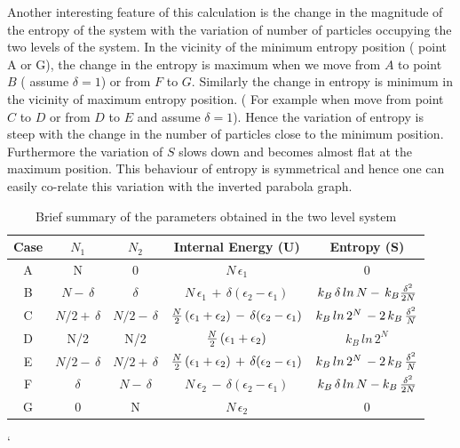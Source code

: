 \documentclass{article}
\begin{document}
Another interesting feature of this calculation  is the change in the magnitude of the entropy of the system with the variation of number of particles occupying the two levels of the system. In the vicinity of the minimum entropy position ( point A or G), the change in the entropy  is maximum when we move from $A$ to point $B$  ( assume $\delta = 1$) or from $ F$ to $ G$.
Similarly the change in entropy is minimum  in the vicinity of maximum entropy position. ( For example when move from point $C$ to $D$ or from $D$ to $E$ and assume $\delta = 1$). Hence the variation of entropy is steep  with the change in the number of particles close to the minimum  position. Furthermore the   variation of $S$  slows down and becomes almost flat at the maximum position. This behaviour of entropy is symmetrical and hence one can easily co-relate this variation with the inverted parabola graph.
 
\begin{table}[ht]
\centering
\renewcommand{\arraystretch}{3}
\begin{tabular}[b]{| c | c| c| c| c|}\hline
 Case & $N_1$ & $N_2 $& Internal Energy (U) & Entropy (S) \\ \hline \hline
A & N & 0 &$ N\,\epsilon_1 $& 0\\ \hline
B & $N - \, \delta$& $\delta$ & $ {N} \, \epsilon_1  \, + \,  \delta ( \epsilon_2 - \epsilon_1)$& $ k_B \, \delta\, ln \, N - \, k_B{\delta^2 \over {2 N}}$\\ \hline
C & ${N/2} + \, \delta$&${N/2} - \, \delta$& ${N\over 2} \,( \epsilon_1 + \epsilon_2) \, - \,  \delta ( \epsilon_2 - \epsilon_1)$ & $ k_B \, ln\, {2^N}\, - {2\, k_B\, {\delta^{2} \over N}} $\\ \hline
D & N/2 & N/2 & ${N\over 2} \,( \epsilon_1 + \epsilon_2)$ & $ k_B \,ln\, 2^N$\\ \hline
E & ${ N / 2 } - \, \delta$ & ${N/2} + \, \delta$ & ${N\over 2} \,( \epsilon_1 + \epsilon_2) \, + \,  \delta ( \epsilon_2 - \epsilon_1)$ & $ k_B \, ln\, {2^N}\, - {2\, k_B\, {\delta^{2} \over N}}  $\\ \hline
F & $\delta$ & $N -\, \delta$ & $ {N} \, \epsilon_2  \, - \,  \delta ( \epsilon_2 - \epsilon_1)$&  $ k_B \, \delta\, ln \, N - k_B\,{ \delta^2 \over {2 N}}$\\ \hline
G & 0 & N & $ N \, \epsilon_2$ & 0\\ \hline
\end{tabular}
\caption{ Brief summary of the parameters obtained in the two level system}
\label{1T}
`\end{table}
\end{document}
